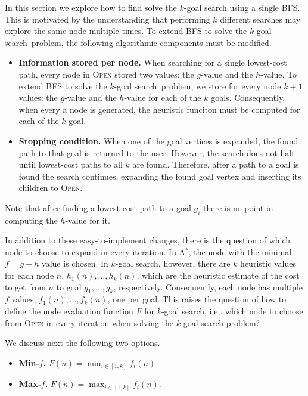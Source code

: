 \documentclass{aicom2e}
\newcommand{\kgs}{$k$-goal search}
\newcommand{\astar}{A$^*$}
\newcommand{\open}{\textsc{Open}}
\begin{document}
In this section we explore how to find solve the \kgs{} using a single BFS. This is motivated by the understanding that performing $k$ different searches may
explore the same node multiple times. 
To extend BFS to solve the \kgs\ problem, the following algorithmic components 
must be modified. 

\begin{itemize}
    \item {\bf Information stored per node.} When searching for a single lowest-cost path, every node in \open{} stored two values: the $g$-value and the $h$-value. To extend BFS to solve the \kgs\ problem, we store for every node $k+1$ values: the $g$-value and the $h$-value for each of the $k$ goals. Consequently, when every a node is generated, the heuristic funciton must be computed for each of the $k$ goal.
    \item {\bf Stopping condition.} When one of the goal vertices is expanded, the found path to that goal is returned to the user. However, the search does not halt until lowest-cost paths to all $k$ are found. Therefore, after a path to a goal is found the search continues, expanding the found goal vertex and inserting its children to \open . 
\end{itemize}
Note that after finding a lowest-cost path to a goal $g_i$ there is no point in
computing the $h$-value for it. 

In addition to these easy-to-implement changes, 
there is the question of which node to choose to expand in every iteration. 
In \astar{}, the node with the minimal $f=g+h$ value is chosen. 
In \kgs{}, however, there are $k$ heuristic values for each node $n$, $h_1(n),\ldots,h_k(n)$, 
which are the heuristic estimate of the cost to get from $n$ to goal $g_1,\ldots,g_k$, respectively.  
Consequently, each node has multiple  $f$ values, $f_1(n),\ldots,f_k(n)$, one per goal. 
This raises the question of how to define the node evaluation function $F$ for \kgs{}, 
i.e,. which node to choose from \open{} in every iteration when solving the \kgs{} problem?

We discuss next the following two options. 
\begin{itemize}
 \item {\bf Min-$f$.} $F(n)=\min_{i\in [1,k]}f_i(n)$. 
 \item {\bf Max-$f$.} $F(n)=\max_{i\in [1,k]}f_i(n)$. 
\end{itemize}
\end{document}
